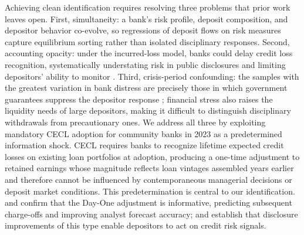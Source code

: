 Achieving clean identification requires resolving three problems that prior work
leaves open.  First, simultaneity: a bank's risk profile, deposit composition,
and depositor behavior co-evolve, so regressions of deposit flows on risk
measures capture equilibrium sorting rather than isolated disciplinary responses.
Second, accounting opacity: under the incurred-loss model, banks could delay
credit loss recognition, systematically understating risk in public disclosures
and limiting depositors' ability to monitor \citep{bushman2012accounting,
bushman2015delayed}.  Third, crisis-period confounding: the samples with the
greatest variation in bank distress are precisely those in which government
guarantees suppress the depositor response \citep{bennett2015market}; financial
stress also raises the liquidity needs of large depositors, making it difficult
to distinguish disciplinary withdrawals from precautionary ones.  We address all
three by exploiting mandatory CECL adoption for community banks in 2023 as a
predetermined information shock.  CECL requires banks to recognize lifetime
expected credit losses on existing loan portfolios at adoption, producing a
one-time adjustment to retained earnings whose magnitude reflects loan vintages
assembled years earlier and therefore cannot be influenced by contemporaneous
managerial decisions or deposit market conditions.  This predetermination is 
central to our identification.  \citet{kim2026current} and \citet{gee2022decision}
confirm that the Day-One adjustment is informative, predicting subsequent
charge-offs and improving analyst forecast accuracy; \citet{nier2006market} and
\citet{chen2022bank} establish that disclosure improvements of this type enable
depositors to act on credit risk signals.

